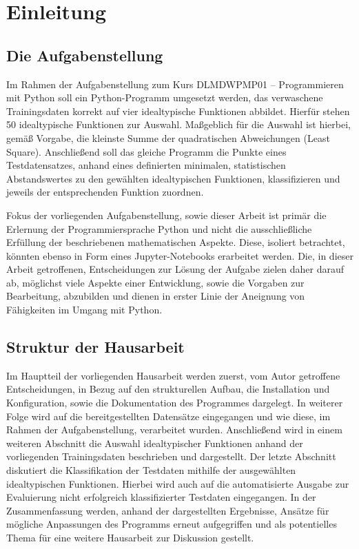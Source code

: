 \chapter{Einleitung}

\section{Die Aufgabenstellung}

Im Rahmen der Aufgabenstellung zum Kurs DLMDWPMP01 – Programmieren mit Python soll ein Python-Programm umgesetzt werden, das verwaschene Trainingsdaten korrekt auf vier idealtypische Funktionen abbildet. Hierfür stehen 50 idealtypische Funktionen zur Auswahl. Maßgeblich für die Auswahl ist hierbei, gemäß Vorgabe, die kleinste Summe der quadratischen Abweichungen (Least Square).
Anschließend soll das gleiche Programm die Punkte eines Testdatensatzes, anhand eines definierten minimalen, statistischen Abstandswertes zu den gewählten idealtypischen Funktionen, klassifizieren und jeweils der entsprechenden Funktion zuordnen.

Fokus der vorliegenden Aufgabenstellung, sowie dieser Arbeit ist primär die Erlernung der Programmiersprache Python und nicht die ausschließliche Erfüllung der beschriebenen mathematischen Aspekte. Diese, isoliert betrachtet, könnten ebenso in Form eines Jupyter-Notebooks erarbeitet werden. Die, in dieser Arbeit getroffenen, Entscheidungen zur Lösung der Aufgabe zielen daher darauf ab, möglichst viele Aspekte einer Entwicklung, sowie die Vorgaben zur Bearbeitung, abzubilden und dienen in erster Linie der Aneignung von Fähigkeiten im Umgang mit Python.


\section{Struktur der Hausarbeit}

Im Hauptteil der vorliegenden Hausarbeit werden zuerst, vom Autor getroffene Entscheidungen, in Bezug auf den strukturellen Aufbau, die Installation und Konfiguration, sowie die Dokumentation des Programmes dargelegt. 
In weiterer Folge wird auf die bereitgestellten Datensätze eingegangen und wie diese, im Rahmen der Aufgabenstellung, verarbeitet wurden.
Anschließend wird in einem weiteren Abschnitt die Auswahl idealtypischer Funktionen anhand der vorliegenden Trainingsdaten beschrieben und dargestellt.
Der letzte Abschnitt diskutiert die Klassifikation der Testdaten mithilfe der ausgewählten idealtypischen Funktionen. Hierbei wird auch auf die automatisierte Ausgabe zur Evaluierung nicht erfolgreich klassifizierter Testdaten eingegangen.
In der Zusammenfassung werden, anhand der dargestellten Ergebnisse, Ansätze für mögliche Anpassungen des Programms erneut aufgegriffen und als potentielles Thema für eine weitere Hausarbeit zur Diskussion gestellt.

